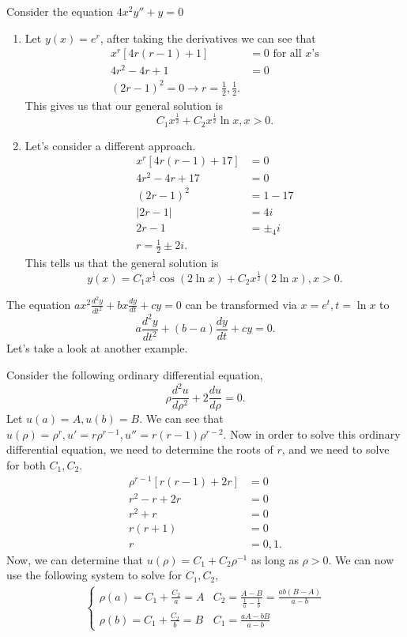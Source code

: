 \begin{eg}
  Consider the equation $4x^2y''+y=0$
  \begin{enumerate}
    \item Let $y(x)=e^{r}$, after taking the derivatives we can see that 
      \begin{align*}
        x^{r}[4r(r-1)+1]&=0\text{ for all $x$'s}\\
        4r^2-4r+1&=0\\
        (2r-1)^2=0\to r=\frac{1}{2},\frac{1}{2}
      .\end{align*}
      This gives us that our general solution is 
      \[
      C_1x^{\frac{1}{2}}+C_2x^{\frac{1}{2}}\ln x, x>0
      .\] 
    \item Let's consider a different approach.
      \begin{align*}
        x^{r}[4r(r-1)+17]&=0\\
        4r^2-4r+17&=0\\
        (2r-1)^2&=1-17\\
        |2r-1|&=4i\\
        2r-1&=\pm_4i\\
        r=\frac{1}{2}\pm 2i
      .\end{align*}
      This tells us that the general solution is 
      \[
        y(x)=C_1x^{\frac{1}{2}}\cos(2\ln x)+C_2x^{\frac{1}{2}}(2\ln x),x>0
      .\] 
  \end{enumerate}
\end{eg}
The equation $ax^2 \frac{d^2y}{dt^2}+bx \frac{dy}{dt}+cy=0$ can be transformed via $x=e^{t},t=\ln x$ to 
\[
  a \frac{d^2y}{dt^2}+(b-a) \frac{dy}{dt}+cy=0
.\] 
Let's take a look at another example.
\begin{eg}
  Consider the following ordinary differential equation,
  \[
  \rho \frac{d^2u}{d\rho^2}+2 \frac{du}{d\rho}=0
  .\] 
  Let $u(a)=A,u(b)=B$. We can see that $u(\rho)=\rho^{r}, u'=r\rho^{r-1}, u''=r(r-1)\rho^{r-2}$. Now in order to solve this ordinary differential equation, we need to determine the roots of $r$, and we need to solve for both $C_1,C_2$.
  \begin{align*}
    \rho^{r-1}[r(r-1)+2r]&=0\\
    r^2-r+2r&=0\\
    r^2+r&=0\\
    r(r+1)&=0\\
    r&=0,1
  .\end{align*}
  Now, we can determine that $u(\rho)=C_1+C_2\rho^{-1}$ as long as $\rho>0$. We can now use the following system to solve for $C_1,C_2$,
\begin{align*}
  \begin{cases}
    \rho(a)=C_1+\frac{C_2}{a}=A & C_2=\frac{A-B}{\frac{1}{a}-\frac{1}{b}}=\frac{ab(B-A)}{a-b}\\
    \rho(b)=C_1+\frac{C_2}{b}=B & C_1=\frac{aA-bB}{a-b}
  \end{cases}
\end{align*}
\end{eg}

